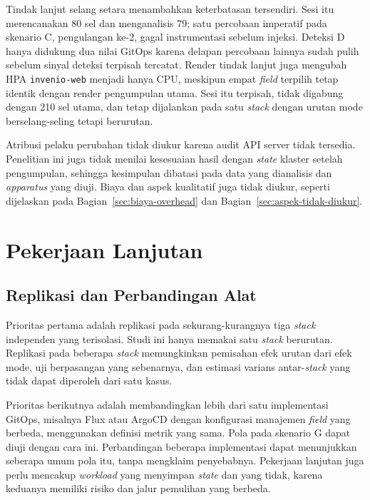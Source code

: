 Tindak lanjut selang setara menambahkan keterbatasan tersendiri. Sesi itu merencanakan 80 sel dan menganalisis 79; satu percobaan imperatif pada skenario C, pengulangan ke-2, gagal instrumentasi sebelum injeksi. Deteksi D hanya didukung dua nilai GitOps karena delapan percobaan lainnya sudah pulih sebelum sinyal deteksi terpisah tercatat. Render tindak lanjut juga mengubah HPA \texttt{invenio-web} menjadi hanya CPU, meskipun empat \textit{field} terpilih tetap identik dengan render pengumpulan utama. Sesi itu terpisah, tidak digabung dengan 210 sel utama, dan tetap dijalankan pada satu \textit{stack} dengan urutan mode berselang-seling tetapi berurutan.

Atribusi pelaku perubahan tidak diukur karena audit API server tidak tersedia. Penelitian ini juga tidak menilai kesesuaian hasil dengan \textit{state} klaster setelah pengumpulan, sehingga kesimpulan dibatasi pada data yang dianalisis dan \textit{apparatus} yang diuji. Biaya dan aspek kualitatif juga tidak diukur, seperti dijelaskan pada Bagian~\ref{sec:biaya-overhead} dan Bagian~\ref{sec:aspek-tidak-diukur}.

\section{Pekerjaan Lanjutan}
\label{sec:pekerjaan-lanjutan}

\subsection{Replikasi dan Perbandingan Alat}
\label{subsec:replikasi}

Prioritas pertama adalah replikasi pada sekurang-kurangnya tiga \textit{stack} independen yang terisolasi. Studi ini hanya memakai satu \textit{stack} berurutan. Replikasi pada beberapa \textit{stack} memungkinkan pemisahan efek urutan dari efek mode, uji berpasangan yang sebenarnya, dan estimasi varians antar-\textit{stack} yang tidak dapat diperoleh dari satu kasus.

Prioritas berikutnya adalah membandingkan lebih dari satu implementasi GitOps, misalnya Flux atau ArgoCD dengan konfigurasi manajemen \textit{field} yang berbeda, menggunakan definisi metrik yang sama. Pola pada skenario G dapat diuji dengan cara ini. Perbandingan beberapa implementasi dapat menunjukkan seberapa umum pola itu, tanpa mengklaim penyebabnya. Pekerjaan lanjutan juga perlu mencakup \textit{workload} yang menyimpan \textit{state} dan yang tidak, karena keduanya memiliki risiko dan jalur pemulihan yang berbeda.

